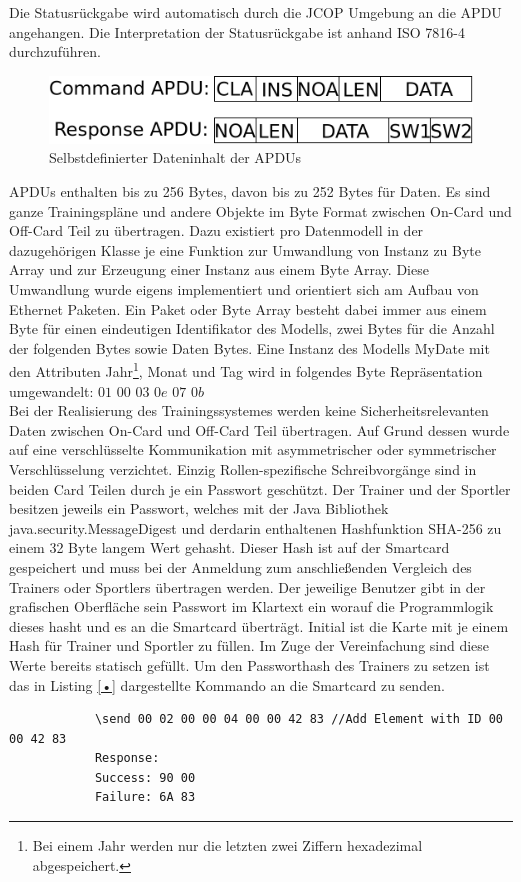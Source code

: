 Die Statusrückgabe wird automatisch durch die JCOP Umgebung an die APDU angehangen. Die Interpretation der Statusrückgabe ist anhand ISO 7816-4 durchzuführen.

\begin{figure}[htb]
\begin{center}
 \includegraphics[width=1\hsize]{./images/myapdu.png}
\end{center}
\caption[Selbstdefinierter Dateninhalt der APDUs]{\label{myapdu}Selbstdefinierter Dateninhalt der APDUs}
\end{figure}

APDUs enthalten bis zu 256 Bytes, davon bis zu 252 Bytes für Daten.
Es sind ganze Trainingspläne und andere Objekte im Byte Format zwischen On-Card und Off-Card Teil zu übertragen. Dazu existiert pro Datenmodell in der dazugehörigen Klasse je eine Funktion zur Umwandlung von Instanz zu Byte Array und zur Erzeugung einer Instanz aus einem Byte Array. Diese Umwandlung  wurde eigens implementiert und orientiert sich am Aufbau von Ethernet Paketen. Ein Paket oder Byte Array besteht dabei immer aus einem Byte für einen eindeutigen Identifikator des Modells, zwei Bytes für die Anzahl der folgenden Bytes sowie Daten Bytes.
Eine Instanz des Modells MyDate mit den Attributen Jahr\footnote{Bei einem Jahr werden nur die letzten zwei Ziffern hexadezimal abgespeichert.}, Monat und Tag wird in folgendes Byte Repräsentation umgewandelt: $01$ $00$ $03$ $0e$ $07$ $0b$
\\

Bei der Realisierung des Trainingssystemes werden keine Sicherheitsrelevanten Daten zwischen On-Card und Off-Card Teil übertragen. Auf Grund dessen wurde auf eine verschlüsselte Kommunikation mit asymmetrischer oder symmetrischer Verschlüsselung verzichtet.
Einzig Rollen-spezifische Schreibvorgänge sind in beiden Card Teilen durch je ein Passwort geschützt.
Der Trainer und der Sportler besitzen jeweils ein Passwort, welches mit der Java Bibliothek java.security.MessageDigest und derdarin enthaltenen  Hashfunktion SHA-256 zu einem 32 Byte langem Wert gehasht.
Dieser Hash ist auf der Smartcard gespeichert und muss bei der Anmeldung zum anschließenden Vergleich des Trainers oder Sportlers übertragen werden.
Der jeweilige Benutzer gibt in der grafischen Oberfläche sein Passwort im Klartext ein worauf die Programmlogik dieses hasht und es an die Smartcard überträgt.
Initial ist die Karte mit je einem Hash für Trainer und Sportler zu füllen. Im Zuge der Vereinfachung sind diese Werte bereits statisch gefüllt.
Um den Passworthash des Trainers zu setzen ist das in Listing \ref{•} dargestellte Kommando an die Smartcard zu senden.

\begin{lstlisting}
			\send 00 02 00 00 04 00 00 42 83 //Add Element with ID 00 00 42 83
			Response:
			Success: 90 00
			Failure: 6A 83
		\end{lstlisting}